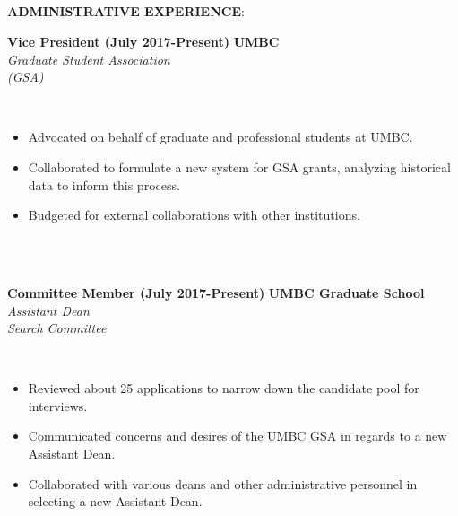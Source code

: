 \documentclass{article}
\begin{document}
\phantom \\
\phantom \\
%
%
%
%
\par
\phantom \\
\phantom \\
\noindent \textbf{ADMINISTRATIVE EXPERIENCE}:\\
\begin{vwcol}[widths={0.8,0.2}, sep=.8cm, justify=flush, rule=0pt, indent=0em]
\noindent \textbf{Vice President (July 2017-Present)}
\newpage
\noindent \textbf{UMBC}\\
\noindent \emph{Graduate Student Association}\\
\noindent \emph{(GSA)}
\end{vwcol}
\phantom \\
\begin{itemize}
\item Advocated on behalf of graduate and professional students at UMBC.
\item Collaborated to formulate a new system for GSA grants, analyzing historical data to inform this process.
\item Budgeted for external collaborations with other institutions.
\end{itemize}
\phantom \\
\phantom\\
%
%
%
%
\begin{vwcol}[widths={0.8,0.2}, sep=.8cm, justify=flush, rule=0pt, indent=0em]
\noindent \textbf{Committee Member (July 2017-Present)}
\newpage
\noindent \textbf{UMBC Graduate School}\\
\noindent \emph{Assistant Dean}\\
\noindent \emph{Search Committee}
\end{vwcol}
\phantom \\
\begin{itemize}
\item Reviewed about 25 applications to narrow down the candidate pool for interviews.
\item Communicated concerns and desires of the UMBC GSA in regards to a new Assistant Dean.
\item Collaborated with various deans and other administrative personnel in selecting a new Assistant Dean.
\end{itemize}
\end{document}
